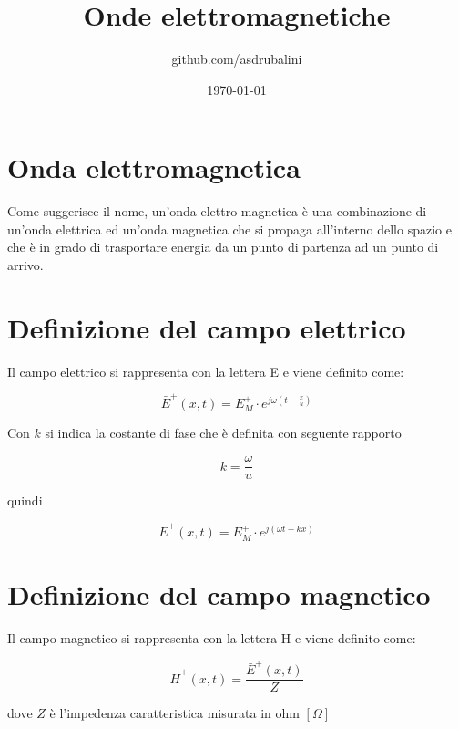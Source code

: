 \documentclass{article}
\title{Onde elettromagnetiche}
\author{github.com/asdrubalini}
\date{\today}
\begin{document}
    \maketitle

    \section{Onda elettromagnetica}

    Come suggerisce il nome, un'onda elettro-magnetica è una combinazione di un'onda elettrica ed un'onda
    magnetica che si propaga all'interno dello spazio e che è in grado di trasportare energia da un punto di
    partenza ad un punto di arrivo.
    
    \section{Definizione del campo elettrico}

    Il campo elettrico si rappresenta con la lettera E e viene definito come:

    \begin{equation}
        \bar{E}^+(x, t) = E^+_M \cdot e^{j\omega (t-\frac{x}{u})}
    \end{equation}

    Con $k$ si indica la costante di fase che è definita con seguente rapporto

    \begin{equation}
        k = \frac{\omega}{u}
    \end{equation}

    quindi

    \begin{equation}
        \bar{E}^+(x, t) = E^+_M \cdot e^{j (\omega t - kx)}
    \end{equation}

    \section{Definizione del campo magnetico}

    Il campo magnetico si rappresenta con la lettera H e viene definito come:

    \begin{equation}
        \bar{H}^+(x,t) = \frac{\bar{E}^+(x,t)}{Z}
    \end{equation}

    dove $Z$ è l'impedenza caratteristica misurata in ohm $[\Omega]$
\end{document}
